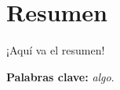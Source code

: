 \chapter{Resumen}
    \thispagestyle{empty}

    ¡Aquí va el resumen!

    \textbf{Palabras clave:} \textit{algo}.
